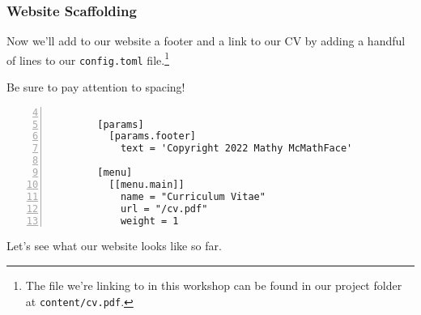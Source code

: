 \begin{frame}[fragile]
    \frametitle{Website Scaffolding}

    Now we'll add to our website a footer and a link to our CV by adding a handful of lines to our \texttt{config.toml} 
    file.\footnote{
      The file we're linking to in this workshop can be found in our project folder at \texttt{content/cv.pdf}.
    } 

    \bigskip
    
    Be sure to pay attention to spacing!

    \smallskip

    \begin{lstlisting}[style=saneCode,gobble=8,title={config.toml},numbers=left,firstnumber=4]
        
        [params]
          [params.footer]
            text = 'Copyright 2022 Mathy McMathFace'
        
        [menu]
          [[menu.main]]
            name = "Curriculum Vitae"
            url = "/cv.pdf"
            weight = 1
    \end{lstlisting}

    \vfill

    Let's see what our website looks like so far.
\end{frame}